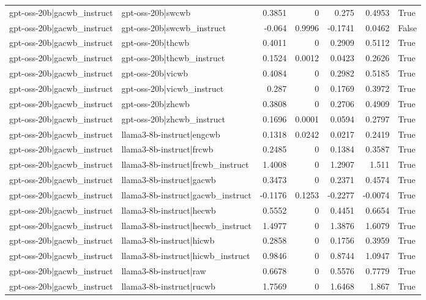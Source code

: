 \begin{table}
\begin{tabular}{l l r r r r l}
gpt-oss-20b|gacwb_instruct & gpt-oss-20b|swcwb & 0.3851 & 0 & 0.275 & 0.4953 & True \\
gpt-oss-20b|gacwb_instruct & gpt-oss-20b|swcwb_instruct & -0.064 & 0.9996 & -0.1741 & 0.0462 & False \\
gpt-oss-20b|gacwb_instruct & gpt-oss-20b|thcwb & 0.4011 & 0 & 0.2909 & 0.5112 & True \\
gpt-oss-20b|gacwb_instruct & gpt-oss-20b|thcwb_instruct & 0.1524 & 0.0012 & 0.0423 & 0.2626 & True \\
gpt-oss-20b|gacwb_instruct & gpt-oss-20b|vicwb & 0.4084 & 0 & 0.2982 & 0.5185 & True \\
gpt-oss-20b|gacwb_instruct & gpt-oss-20b|vicwb_instruct & 0.287 & 0 & 0.1769 & 0.3972 & True \\
gpt-oss-20b|gacwb_instruct & gpt-oss-20b|zhcwb & 0.3808 & 0 & 0.2706 & 0.4909 & True \\
gpt-oss-20b|gacwb_instruct & gpt-oss-20b|zhcwb_instruct & 0.1696 & 0.0001 & 0.0594 & 0.2797 & True \\
gpt-oss-20b|gacwb_instruct & llama3-8b-instruct|engcwb & 0.1318 & 0.0242 & 0.0217 & 0.2419 & True \\
gpt-oss-20b|gacwb_instruct & llama3-8b-instruct|frcwb & 0.2485 & 0 & 0.1384 & 0.3587 & True \\
gpt-oss-20b|gacwb_instruct & llama3-8b-instruct|frcwb_instruct & 1.4008 & 0 & 1.2907 & 1.511 & True \\
gpt-oss-20b|gacwb_instruct & llama3-8b-instruct|gacwb & 0.3473 & 0 & 0.2371 & 0.4574 & True \\
gpt-oss-20b|gacwb_instruct & llama3-8b-instruct|gacwb_instruct & -0.1176 & 0.1253 & -0.2277 & -0.0074 & True \\
gpt-oss-20b|gacwb_instruct & llama3-8b-instruct|hecwb & 0.5552 & 0 & 0.4451 & 0.6654 & True \\
gpt-oss-20b|gacwb_instruct & llama3-8b-instruct|hecwb_instruct & 1.4977 & 0 & 1.3876 & 1.6079 & True \\
gpt-oss-20b|gacwb_instruct & llama3-8b-instruct|hicwb & 0.2858 & 0 & 0.1756 & 0.3959 & True \\
gpt-oss-20b|gacwb_instruct & llama3-8b-instruct|hicwb_instruct & 0.9846 & 0 & 0.8744 & 1.0947 & True \\
gpt-oss-20b|gacwb_instruct & llama3-8b-instruct|raw & 0.6678 & 0 & 0.5576 & 0.7779 & True \\
gpt-oss-20b|gacwb_instruct & llama3-8b-instruct|rucwb & 1.7569 & 0 & 1.6468 & 1.867 & True \\

\end{tabular}
\end{table}

